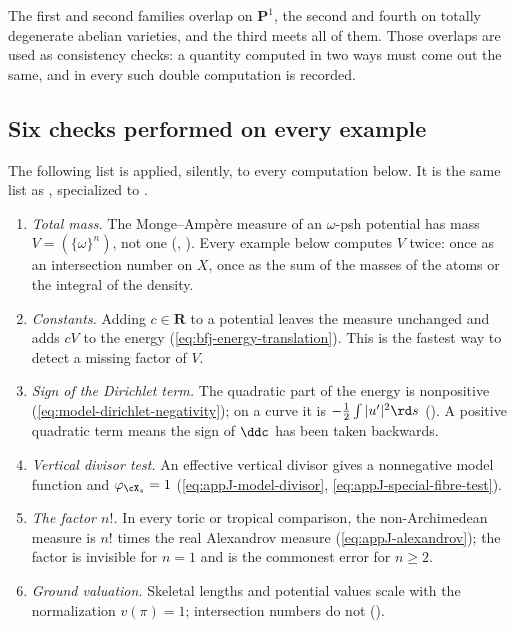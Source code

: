 The first and second families overlap on $\mathbf P^1$, the second and
fourth on totally degenerate abelian varieties, and the third meets all of
them.  Those overlaps are used as consistency checks: a quantity computed in
two ways must come out the same, and in  every
such double computation is recorded.

\subsection{Six checks performed on every example}
\label{sec:ch31-checks}

The following list is applied, silently, to every computation below.  It is
the same list as , specialized to
.

\begin{enumerate}
\item\label{itm:ch31-check:mass}
 \emph{Total mass.}  The Monge--Amp\`ere measure of an $\omega$-psh
 potential has mass $V=(\{\omega\}^n)$, not one
 (, ).  Every example below
 computes $V$ twice: once as an intersection number on $X$, once as the
 sum of the masses of the atoms or the integral of the density.
\item\label{itm:ch31-check:constant}
 \emph{Constants.}  Adding $c\in\mathbf R$ to a potential leaves the
 measure unchanged and adds $cV$ to the energy
 (\eqref{eq:bfj-energy-translation}).  This is the fastest way to detect a
 missing factor of $V$.
\item\label{itm:ch31-check:sign}
 \emph{Sign of the Dirichlet term.}  The quadratic part of the energy is
 nonpositive (\eqref{eq:model-dirichlet-negativity}); on a curve it is
 $-\tfrac12\int|u'|^2\rd s$ ().  A positive
 quadratic term means the sign of $\ddc$ has been taken backwards.
\item\label{itm:ch31-check:vertical}
 \emph{Vertical divisor test.}  An effective vertical divisor gives a
 nonnegative model function and $\varphi_{\cX_s}=1$
 (\eqref{eq:appJ-model-divisor}, \eqref{eq:appJ-special-fibre-test}).
\item\label{itm:ch31-check:factorial}
 \emph{The factor $n!$.}  In every toric or tropical comparison, the
 non-Archimedean measure is $n!$ times the real Alexandrov measure
 (\eqref{eq:appJ-alexandrov}); the factor is invisible for $n=1$ and is
 the commonest error for $n\geq2$.
\item\label{itm:ch31-check:normalization}
 \emph{Ground valuation.}  Skeletal lengths and potential values scale with
 the normalization $v(\pi)=1$; intersection numbers do not
 ().
\end{enumerate}

